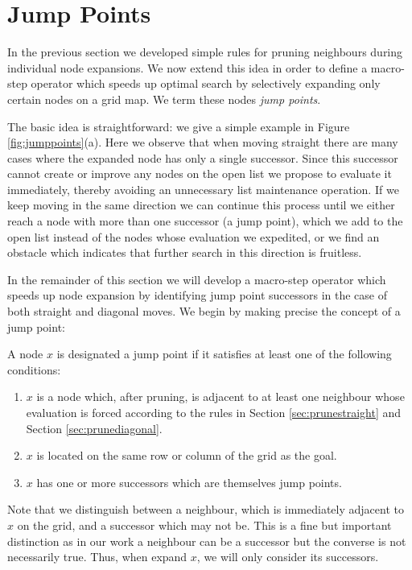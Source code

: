 \section{Jump Points}
In the previous section we developed simple rules for pruning neighbours during 
individual node expansions. We now extend this idea in order to define a 
macro-step operator which speeds up optimal search by selectively expanding
only certain nodes on a grid map. We term these nodes \emph{jump points}.
\par
The basic idea is straightforward: we give a simple example in Figure 
\ref{fig:jumppoints}(a).
Here we observe that when moving straight there are many cases where
the expanded node has only a single successor.
Since this successor cannot create or improve any nodes on the open list we 
propose to evaluate it immediately, thereby avoiding an unnecessary list
maintenance operation. 
If we keep moving in the same direction we can continue this process until we 
either reach a node with more than one successor (a jump point), which we add to the open list instead of the nodes whose evaluation we expedited, or we find an 
obstacle which indicates that further search in this direction is fruitless.
\par
In the remainder of this section we will develop a macro-step operator which 
speeds up node expansion by identifying jump point successors in the case of
both straight and diagonal moves. We begin by making precise the concept of a
jump point:

\begin{definition}
\label{def:jump}
A node $x$ is designated a jump point if it satisfies at least one of the following
conditions:
\begin{enumerate}
\item{$x$ is a node which, after pruning, is adjacent to at least one neighbour
whose evaluation is forced according to the rules in Section
\ref{sec:prunestraight} and Section \ref{sec:prunediagonal}.}
\item{$x$ is located on the same row or column of the grid as the goal.}
\item{$x$ has one or more successors which are themselves jump points.}
\end{enumerate}
\end{definition}

Note that we distinguish between a neighbour, which is immediately adjacent to
$x$ on the grid, and a successor which may not be. 
This is a fine but important distinction as in our work a neighbour can be a 
successor but the converse is not necessarily true.
Thus, when expand $x$, we will only consider its successors.


